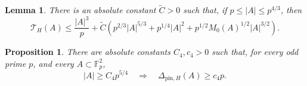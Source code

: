 \documentclass[10pt,a4paper]{amsart}
\newtheorem{proposition}{Proposition}
\newtheorem{lemma}{Lemma}
\newcommand{\F}{\mathbb F}
\begin{document}
\begin{lemma}
\label{lem:split-isosceles}
There is an absolute constant $\widetilde{C}>0$ such that, if
$p\le |A|\le p^{4/3}$, then
\begin{equation}\label{eq:split-isosceles}
\mathcal T_H(A) \le \frac{|A|^3}{p}+\widetilde{C}\left(p^{2/3}|A|^{5/3}+p^{1/4}|A|^2 + p^{1/2}M_0(A)^{1/2}|A|^{3/2}\right).
\end{equation}
\end{lemma}

\begin{proposition}
\label{prop:prime-planar-both-2}
There are absolute constants $C_4,c_4>0$ such that, for every odd
prime $p$, and every $A\subset\F_p^2$,
\begin{equation} \label{eq:prime-planar-both}
|A|\ge C_4 p^{5/4} \quad\Longrightarrow\quad \Delta_{\mathrm{pin},H}(A)\ge c_4 p.
\end{equation}
\end{proposition}
\end{document}

